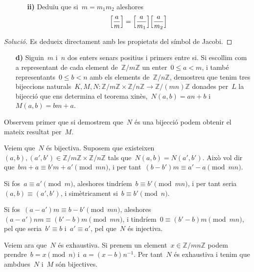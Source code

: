 \documentclass[a4paper]{article}
\newcommand{\ZZ}{\mathbb{Z}}
\newenvironment{solution}{
    \renewcommand\qedsymbol{\ensuremath{\lozenge}}
    \begin{proof}[Solució]
        }{
    \end{proof}
}
\begin{document}
\begin{enumerate}
    \item[] \begin{enumerate}
        \item[\textbf{ii)}] Deduïu que si~\(m=m_{1}m_{2}\) aleshores
            \[
                \Bigl[\frac{a}{m}\Bigr]
                =
                \Bigl[\frac{a}{m_{1}}\Bigr]
                \Bigl[\frac{a}{m_{2}}\Bigr]
            \]
    \end{enumerate}
\end{enumerate}

\begin{solution}
    Es dedueix directament amb les propietats del símbol de Jacobi.
\end{solution}

\begin{enumerate}
    \item[\textbf{d)}] Siguin~\(m\) i~\(n\) dos enters senars positius i primers
        entre si. Si escollim com a representant de cada element de~\(\ZZ/m\ZZ\)
        un enter~\(0\leq a<m\), i també representants~\(0\leq b<n\) amb els
        elements de~\(\ZZ/n\ZZ\), demostreu que tenim tres bijeccions
        naturals~\(K,M,N:\ZZ/m\ZZ\times\ZZ/n\ZZ\rightarrow\ZZ/(mn)\ZZ\) donades
        per~\(L\) la bijecció que ens determina el teorema
        xinès,~\(N(a,b)=an+b\) i~\(M(a,b)=bm+a\).
\end{enumerate}

Observem primer que si demostrem que~\(N\) és una bijecció podem obtenir el
mateix resultat per~\(M\).

Veiem que~\(N\) és bijectiva. Suposem que
existeixen~\((a,b),(a',b')\in\ZZ/m\ZZ\times\ZZ/n\ZZ\) tals
que~\(N(a,b)=N(a',b')\). Això vol dir que~\(bm+a\equiv b'm+a'\pmod{mn}\), i per
tant~\((b-b')m\equiv a'-a\pmod{mn}\).

Si fos~\(a\equiv a'\pmod{m}\), aleshores tindríem~\(b\equiv b'\pmod{mn}\), i per
tant seria~\((a,b)\equiv(a',b')\), i simètricament si~\(b\equiv b'\pmod{n}\).

Si fos~\((a-a')m\equiv b-b'\pmod{mn}\),
aleshores~\((a-a')nm\equiv(b'-b)m\pmod{mn}\), i
tindríem~\(0\equiv(b'-b)m\pmod{mn}\), pel que seria~\(b'\equiv b\) i~\(a'\equiv
a'\), pel que~\(N\) és injectiva.

Veiem ara que~\(N\) és exhaustiva. Si prenem un element~\(x\in\ZZ/mn\ZZ\) podem
prendre~\(b=x\pmod{n}\) i~\(a=(x-b)n^{-1}\). Per tant~\(N\) és exhaustiva i
tenim que ambdues~\(N\) i~\(M\) són bijectives.
\end{document}
